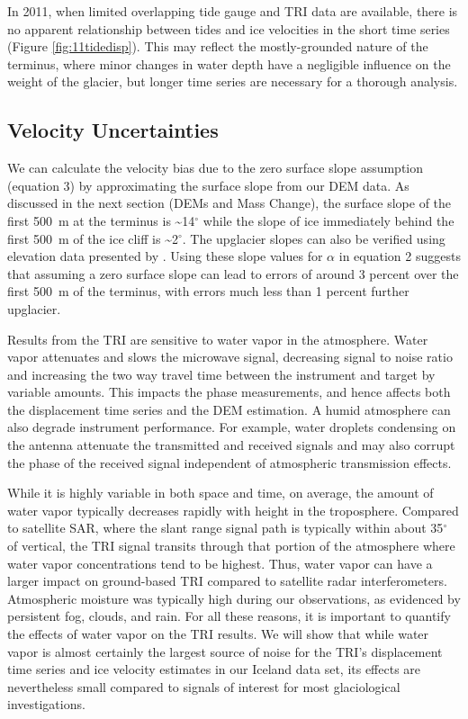 \documentclass[review]{igs}
\begin{document}
In 2011, when limited overlapping tide gauge and TRI data are available, there is no apparent relationship between tides and ice velocities in the short time series (Figure \ref{fig:11tidedisp}). This may reflect the mostly-grounded nature of the terminus, where minor changes in water depth have a negligible influence on the weight of the glacier, but longer time series are necessary for a thorough analysis.


\subsection{Velocity Uncertainties}
We can calculate the velocity bias due to the zero surface slope assumption (equation 3) by approximating the surface slope from our DEM data. As discussed in the next section (DEMs and Mass Change), the surface slope of the first 500~m at the terminus is \textasciitilde14$^\circ$ while the slope of ice immediately behind the first 500~m of the ice cliff is \textasciitilde2$^\circ$. The upglacier slopes can also be verified using elevation data presented by \citet{bjornsson2001jokulsarlon}. Using these slope values for $\alpha$ in equation 2 suggests that assuming a zero surface slope can lead to errors of around 3 percent over the first 500~m of the terminus, with errors much less than 1 percent further upglacier.

Results from the TRI are sensitive to water vapor in the atmosphere.  Water vapor attenuates and slows the microwave signal, decreasing signal to noise ratio and increasing the two way travel time between the instrument and target by variable amounts.  This impacts the phase measurements, and hence affects both the displacement time series and the DEM estimation.  A humid atmosphere can also degrade instrument performance.  For example, water droplets condensing on the antenna attenuate the transmitted and received signals and may also corrupt the phase of the received signal independent of atmospheric transmission effects.  

While it is highly variable in both space and time, on average, the amount of water vapor typically decreases rapidly with height in the troposphere.  Compared to satellite SAR, where the slant range signal path is typically within about 35$^{\circ}$ of vertical, the TRI signal transits through that portion of the atmosphere where water vapor concentrations tend to be highest.  Thus, water vapor can have a larger impact on ground-based TRI compared to satellite radar interferometers. Atmospheric moisture was typically high during our observations, as evidenced by persistent fog, clouds, and rain. For all these reasons, it is important to quantify the effects of water vapor on the TRI results.  We will show that while water vapor is almost certainly the largest source of noise for the TRI’s displacement time series and ice velocity estimates in our Iceland data set, its effects are nevertheless small compared to signals of interest for most glaciological investigations.  
\end{document}
